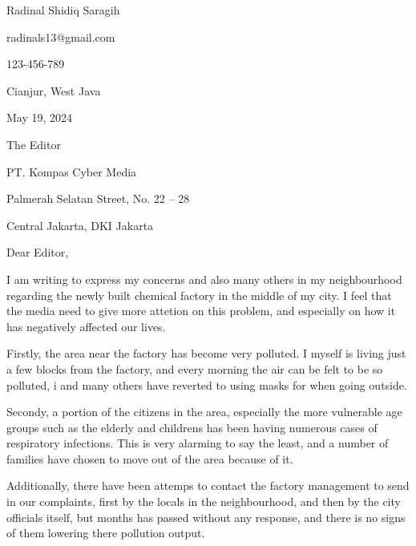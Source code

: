\documentclass[11pt, a4paper]{article}
\date{}
\begin{document}
  \begin{flushleft}
    Radinal Shidiq Saragih

    radinals13@gmail.com

    123-456-789

    Cianjur, West Java

    May 19, 2024

    \vspace{0.5cm}

    The Editor

    PT. Kompas Cyber Media

    Palmerah Selatan Street, No. 22 – 28

    Central Jakarta, DKI Jakarta

    \vspace{0.5cm}

    Dear Editor,

    \vspace{0.5cm}

    I am writing to express my concerns and also many others in my
    neighbourhood regarding the newly built chemical factory in the
    middle of my city. I feel that the media need to give more attetion
    on this problem, and especially on how it has negatively affected our lives.

    \vspace{0.2cm}

    Firstly, the area near the factory has become very polluted. I myself is
    living just a few blocks from the factory, and every morning the air can
    be felt to be so polluted, i and many others have reverted to using masks
    for when going outside.

    \vspace{0.2cm}

    Secondy, a portion of the citizens in the area, especially the more
    vulnerable age groups such as the elderly and childrens has been having
    numerous cases of respiratory infections. This is very alarming to
    say the least, and a number of families have chosen to move out of the
    area because of it.

    \vspace{0.2cm}

    Additionally, there have been attemps to contact the factory management
    to send in our complaints, first by the locals in the neighbourhood,
    and then by the city officials itself, but months has passed without any
    response, and there is no signs of them lowering there pollution output.


\end{flushleft}
\end{document}
